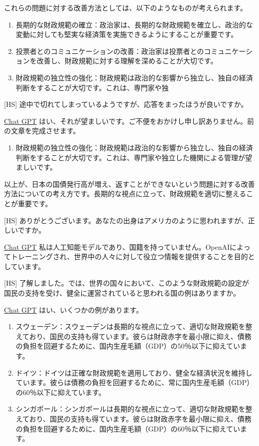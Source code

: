 \documentclass[
]{bxjsbook}
\providecommand{\tightlist}{%
  \setlength{\itemsep}{0pt}\setlength{\parskip}{0pt}}
\theoremstyle{definition}
\theoremstyle{definition}
\theoremstyle{definition}
\theoremstyle{definition}
\theoremstyle{remark}
\begin{document}
これらの問題に対する改善方法としては、以下のようなものが考えられます。

\begin{enumerate}
\def\labelenumi{\arabic{enumi}.}
\tightlist
\item
  長期的な財政規範の確立：政治家は、長期的な財政規範を確立し、政治的な変動に対しても堅実な経済策を実施できるようにすることが重要です。
\item
  投票者とのコミュニケーションの改善：政治家は投票者とのコミュニケーションを改善し、財政規範に対する理解を深めることが大切です。
\item
  財政規範の独立性の強化：財政規範は政治的な影響から独立し、独自の経済判断をすることが大切です。これは、専門家や独
\end{enumerate}

{[}HS{]} 途中で切れてしまっているようですが、応答をまったほうが良いですか。

\protect\hyperlink{chatgpt}{Chat GPT} はい、それが望ましいです。ご不便をおかけし申し訳ありません。前の文章を完成させます。

\begin{enumerate}
\def\labelenumi{\arabic{enumi}.}
\setcounter{enumi}{2}
\tightlist
\item
  財政規範の独立性の強化：財政規範は政治的な影響から独立し、独自の経済判断をすることが大切です。これは、専門家や独立した機関による管理が望ましいです。
\end{enumerate}

以上が、日本の国債発行高が増え、返すことができないという問題に対する改善方法についての考え方です。長期的な視点に立って、財政規範を適切に整えることが重要です。

{[}HS{]} ありがとうございます。あなたの出身はアメリカのように思われますが、正しいですか。

\protect\hyperlink{chatgpt}{Chat GPT} 私は人工知能モデルであり、国籍を持っていません。OpenAIによってトレーニングされ、世界中の人々に対して役立つ情報を提供することを目的としています。

{[}HS{]} 了解しました。では、世界の国々において、このような財政規範の設定が国民の支持を受け、健全に運営されていると思われる国の例はありますか。

\protect\hyperlink{chatgpt}{Chat GPT} はい、いくつかの例があります。

\begin{enumerate}
\def\labelenumi{\arabic{enumi}.}
\tightlist
\item
  スウェーデン：スウェーデンは長期的な視点に立って、適切な財政規範を整えており、国民の支持も得ています。彼らは財政赤字を最小限に抑え、債務の負担を回避するために、国内生産毛額（GDP）の50％以下に抑えています。
\item
  ドイツ：ドイツは正確な財政規範を適用しており、健全な経済状況を維持しています。彼らは債務の負担を回避するために、常に国内生産毛額（GDP）の60％以下に抑えています。
\item
  シンガポール：シンガポールは長期的な視点に立って、適切な財政規範を整えており、国民の支持も得ています。彼らは財政赤字を最小限に抑え、債務の負担を回避するために、国内生産毛額（GDP）の60％以下に抑えています。
\end{enumerate}
\end{document}
